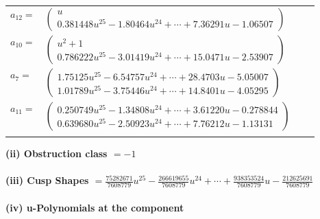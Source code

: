 \documentclass[1p]{elsarticle_modified}
\theoremstyle{definition}
\begin{document}
\begin{tabular}{m{7pt} m{180pt} m{7pt} m{180pt} }
\flushright $a_{12}=$&$\begin{pmatrix}u\\0.381448 u^{25}-1.80464 u^{24}+\cdots+7.36291 u-1.06507\end{pmatrix}$ \\
\flushright $a_{10}=$&$\begin{pmatrix}u^2+1\\0.786222 u^{25}-3.01419 u^{24}+\cdots+15.0471 u-2.53907\end{pmatrix}$ \\
\flushright $a_{7}=$&$\begin{pmatrix}1.75125 u^{25}-6.54757 u^{24}+\cdots+28.4703 u-5.05007\\1.01789 u^{25}-3.75446 u^{24}+\cdots+14.8401 u-4.05295\end{pmatrix}$ \\
\flushright $a_{11}=$&$\begin{pmatrix}0.250749 u^{25}-1.34808 u^{24}+\cdots+3.61220 u-0.278844\\0.639680 u^{25}-2.50923 u^{24}+\cdots+7.76212 u-1.13131\end{pmatrix}$\\&\end{tabular}
\flushleft \textbf{(ii) Obstruction class $= -1$}\\~\\
\flushleft \textbf{(iii) Cusp Shapes $= \frac{75282671}{7608779} u^{25}-\frac{266619655}{7608779} u^{24}+\cdots+\frac{938353524}{7608779} u-\frac{212625691}{7608779}$}\\~\\
\newpage\renewcommand{\arraystretch}{1}
\flushleft \textbf{(iv) u-Polynomials at the component}\newline \\
\end{document}
